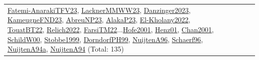 {\begin{longtable}{p{3cm}r>{\raggedright\arraybackslash}p{6cm}>{\raggedright\arraybackslash}p{6cm}>{\raggedright\arraybackslash}p{8cm}}
\hyperref[detail:Fatemi-AnarakiTFV23]{Fatemi-AnarakiTFV23}, \hyperref[detail:LacknerMMWW23]{LacknerMMWW23}, \hyperref[detail:Danzinger2023]{Danzinger2023}, \hyperref[detail:KameugneFND23]{KameugneFND23}, \hyperref[detail:AbreuNP23]{AbreuNP23}, \hyperref[detail:AlakaP23]{AlakaP23}, \hyperref[detail:El-Kholany2022]{El-Kholany2022}, \hyperref[detail:TouatBT22]{TouatBT22}, \hyperref[detail:Relich2022]{Relich2022}, \hyperref[detail:FarsiTM22]{FarsiTM22}...\hyperref[detail:Hofe2001]{Hofe2001}, \hyperref[detail:Henz01]{Henz01}, \hyperref[detail:Chan2001]{Chan2001}, \hyperref[detail:SchildW00]{SchildW00}, \hyperref[detail:Stobbe1999]{Stobbe1999}, \hyperref[detail:DorndorfPH99]{DorndorfPH99}, \hyperref[detail:NuijtenA96]{NuijtenA96}, \hyperref[detail:Schaerf96]{Schaerf96}, \hyperref[detail:NuijtenA94a]{NuijtenA94a}, \hyperref[detail:NuijtenA94]{NuijtenA94} (Total: 135)\\
\end{longtable}
}

\clearpage
